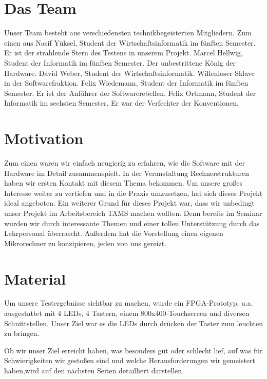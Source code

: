 \section{Das Team}
Unser Team besteht aus verschiedensten technikbegeisterten Mitgliedern. Zum einen aus Nasif Yüksel, Student der Wirtschaftsinformatik im fünften Semester. Er ist der strahlende Stern des Testens in unserem Projekt. Marcel Hellwig, Student der Informatik im fünften Semester. Der unbestrittene König der Hardware. David Weber, Student der Wirtschaftsinformatik. Willenloser Sklave in der Softwarefraktion. Felix Wiedemann, Student der Informatik im fünften Semester. Er ist der Anführer der Softwarerebellen. Felix Ortmann, Student der Informatik im sechsten Semester. Er war der Verfechter der Konventionen.

\section{Motivation}
Zum einen waren wir einfach neugierig zu erfahren, wie die Software mit der Hardware im Detail zusammenspielt. In der Veranstaltung Rechnerstrukturen haben wir ersten Kontakt mit diesem Thema bekommen. Um unsere großes Interesse weiter zu vertiefen und in die Praxis umzusetzen, hat sich dieses Projekt ideal angeboten.
Ein weiterer Grund für dieses Projekt war, dass wir unbedingt unser Projekt im Arbeitsbereich TAMS machen wollten. Denn bereits im Seminar wurden wir durch interessante Themen und einer tollen Unterstützung durch das Lehrpersonal überrascht.
Außerdem hat die Vorstellung einen eigenen Mikrorechner zu konzipieren, jeden von uns gereizt.

\section{Material}
Um unsere Testergebnisse sichtbar zu machen, wurde ein FPGA-Prototyp, u.a. ausgestattet mit 4 LEDs, 4 Tastern, einem 800x400-Touchscreen und diversen Schnittstellen. Unser Ziel war es die LEDs durch drücken der Taster zum leuchten zu bringen. %

Ob wir unser Ziel erreicht haben, was besonders gut oder schlecht lief, auf was für Schwierigkeiten wir gestoßen sind und welche Herausforderungen wir gemeistert haben,wird auf den nächsten Seiten detailliert darstellen. %

